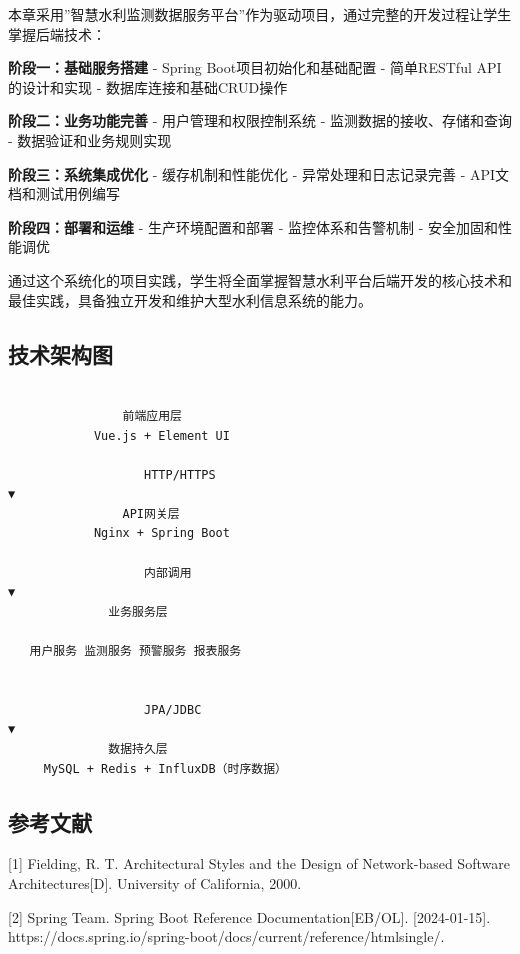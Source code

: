 本章采用''智慧水利监测数据服务平台''作为驱动项目，通过完整的开发过程让学生掌握后端技术：

\textbf{阶段一：基础服务搭建} - Spring Boot项目初始化和基础配置 - 简单RESTful API的设计和实现 - 数据库连接和基础CRUD操作

\textbf{阶段二：业务功能完善} - 用户管理和权限控制系统 - 监测数据的接收、存储和查询 - 数据验证和业务规则实现

\textbf{阶段三：系统集成优化} - 缓存机制和性能优化 - 异常处理和日志记录完善 - API文档和测试用例编写

\textbf{阶段四：部署和运维} - 生产环境配置和部署 - 监控体系和告警机制 - 安全加固和性能调优

通过这个系统化的项目实践，学生将全面掌握智慧水利平台后端开发的核心技术和最佳实践，具备独立开发和维护大型水利信息系统的能力。

\subsection{技术架构图}\label{ux6280ux672fux67b6ux6784ux56fe}

\begin{verbatim}

                前端应用层                       
            Vue.js + Element UI                

                   HTTP/HTTPS
▼
                API网关层                        
            Nginx + Spring Boot                

                   内部调用
▼
              业务服务层                         
        
   用户服务 监测服务 预警服务 报表服务      
        

                   JPA/JDBC
▼
              数据持久层                         
     MySQL + Redis + InfluxDB（时序数据）       
\end{verbatim}

\subsection{参考文献}\label{ux53c2ux8003ux6587ux732e}

{[}1{]} Fielding, R. T. Architectural Styles and the Design of Network-based Software Architectures{[}D{]}. University of California, 2000.

{[}2{]} Spring Team. Spring Boot Reference Documentation{[}EB/OL{]}. {[}2024-01-15{]}. https://docs.spring.io/spring-boot/docs/current/reference/htmlsingle/.

